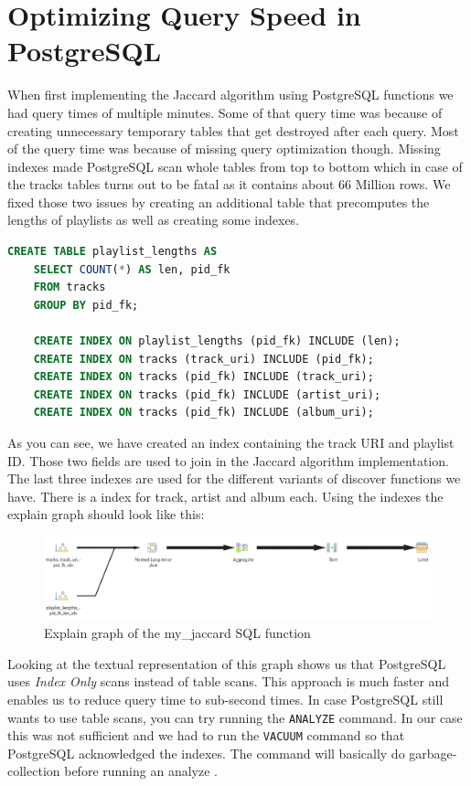 \section{Optimizing Query Speed in PostgreSQL}

When first implementing the Jaccard algorithm using PostgreSQL functions we had query times of multiple minutes. Some of that query time was because of creating unnecessary temporary tables that get destroyed after each query. Most of the query time was because of missing query optimization though. Missing indexes made PostgreSQL scan whole tables from top to bottom which in case of the tracks tables turns out to be fatal as it contains about 66 Million rows. We fixed those two issues by creating an additional table that precomputes the lengths of playlists as well as creating some indexes.

\begin{lstlisting}[caption={Increasing query performance using a precomputed table and indexes}, style=Base, language=SQL]
    CREATE TABLE playlist_lengths AS
    SELECT COUNT(*) AS len, pid_fk
    FROM tracks
    GROUP BY pid_fk;

    CREATE INDEX ON playlist_lengths (pid_fk) INCLUDE (len);
    CREATE INDEX ON tracks (track_uri) INCLUDE (pid_fk);
    CREATE INDEX ON tracks (pid_fk) INCLUDE (track_uri);
    CREATE INDEX ON tracks (pid_fk) INCLUDE (artist_uri);
    CREATE INDEX ON tracks (pid_fk) INCLUDE (album_uri);
\end{lstlisting}

As you can see, we have created an index containing the track \ac{URI} and playlist ID. Those two fields are used to join in the Jaccard algorithm implementation. The last three indexes are used for the different variants of discover functions we have. There is a index for track, artist and album each. Using the indexes the explain graph should look like this:

\begin{figure}[bth]
    \centering
    \includegraphics[width=1.0\textwidth]{Graphics/Chapter4/my-jaccard-explain.png}
    \caption{Explain graph of the my{\_}jaccard \acs{SQL} function}
\end{figure}

Looking at the textual representation of this graph shows us that PostgreSQL uses \textit{Index Only} scans instead of table scans. This approach is much faster and enables us to reduce query time to sub-second times. In case PostgreSQL still wants to use table scans, you can try running the \texttt{ANALYZE} command. In our case this was not sufficient and we had to run the \texttt{VACUUM} command so that PostgreSQL acknowledged the indexes. The command will basically do garbage-collection before running an analyze \cite{PostgresVacuum}.
